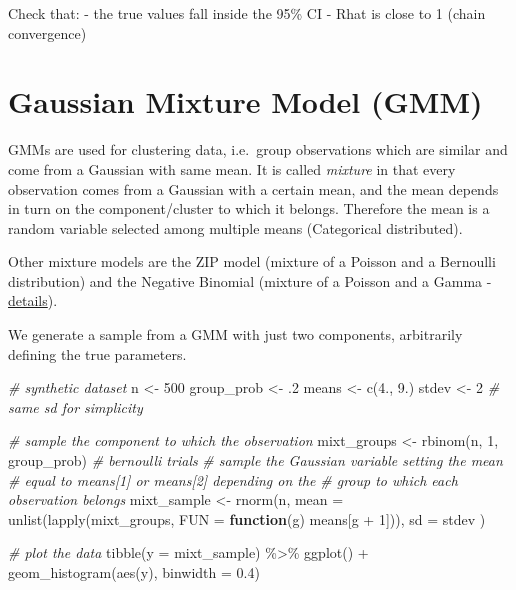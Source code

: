 \documentclass[
  oneside]{book}
\newenvironment{Shaded}{\begin{snugshade}}{\end{snugshade}}
\newcommand{\AttributeTok}[1]{\textcolor[rgb]{0.77,0.63,0.00}{#1}}
\newcommand{\CommentTok}[1]{\textcolor[rgb]{0.56,0.35,0.01}{\textit{#1}}}
\newcommand{\ControlFlowTok}[1]{\textcolor[rgb]{0.13,0.29,0.53}{\textbf{#1}}}
\newcommand{\DecValTok}[1]{\textcolor[rgb]{0.00,0.00,0.81}{#1}}
\newcommand{\FloatTok}[1]{\textcolor[rgb]{0.00,0.00,0.81}{#1}}
\newcommand{\FunctionTok}[1]{\textcolor[rgb]{0.00,0.00,0.00}{#1}}
\newcommand{\NormalTok}[1]{#1}
\newcommand{\OtherTok}[1]{\textcolor[rgb]{0.56,0.35,0.01}{#1}}
\newcommand{\SpecialCharTok}[1]{\textcolor[rgb]{0.00,0.00,0.00}{#1}}
\begin{document}
Check that:
- the true values fall inside the 95\% CI
- Rhat is close to 1 (chain convergence)

\hypertarget{gaussian-mixture-model-gmm}{%
\section{Gaussian Mixture Model (GMM)}\label{gaussian-mixture-model-gmm}}

GMMs are used for clustering data, i.e.~group
observations which are similar and come from a Gaussian
with same mean.
It is called \emph{mixture} in that every observation comes from
a Gaussian with a certain mean, and the mean depends in turn on
the component/cluster to which it belongs. Therefore the mean is
a random variable selected among multiple means (Categorical distributed).

Other mixture models are the ZIP model (mixture of a Poisson and a Bernoulli
distribution) and the Negative Binomial (mixture of a Poisson and a Gamma -
\href{https://en.wikipedia.org/wiki/Negative_binomial_distribution\#Gamma\%E2\%80\%93Poisson_mixture}{details}).

We generate a sample from a GMM with just two components, arbitrarily
defining the true parameters.

\begin{Shaded}
\begin{Highlighting}[]
\CommentTok{\# synthetic dataset}
\NormalTok{n }\OtherTok{\textless{}{-}} \DecValTok{500}
\NormalTok{group\_prob }\OtherTok{\textless{}{-}}\NormalTok{ .}\DecValTok{2}
\NormalTok{means }\OtherTok{\textless{}{-}} \FunctionTok{c}\NormalTok{(}\FloatTok{4.}\NormalTok{, }\FloatTok{9.}\NormalTok{)}
\NormalTok{stdev }\OtherTok{\textless{}{-}} \DecValTok{2} \CommentTok{\# same sd for simplicity}

\CommentTok{\# sample the component to which the observation}
\NormalTok{mixt\_groups }\OtherTok{\textless{}{-}} \FunctionTok{rbinom}\NormalTok{(n, }\DecValTok{1}\NormalTok{, group\_prob) }\CommentTok{\# bernoulli trials}
\CommentTok{\# sample the Gaussian variable setting the mean}
\CommentTok{\# equal to means[1] or means[2] depending on the}
\CommentTok{\# group to which each observation belongs}
\NormalTok{mixt\_sample }\OtherTok{\textless{}{-}} \FunctionTok{rnorm}\NormalTok{(n,}
  \AttributeTok{mean =} \FunctionTok{unlist}\NormalTok{(}\FunctionTok{lapply}\NormalTok{(mixt\_groups, }\AttributeTok{FUN =} \ControlFlowTok{function}\NormalTok{(g) means[g }\SpecialCharTok{+} \DecValTok{1}\NormalTok{])),}
  \AttributeTok{sd =}\NormalTok{ stdev}
\NormalTok{)}

\CommentTok{\# plot the data}
\FunctionTok{tibble}\NormalTok{(}\AttributeTok{y =}\NormalTok{ mixt\_sample) }\SpecialCharTok{\%\textgreater{}\%}
  \FunctionTok{ggplot}\NormalTok{() }\SpecialCharTok{+}
  \FunctionTok{geom\_histogram}\NormalTok{(}\FunctionTok{aes}\NormalTok{(y), }\AttributeTok{binwidth =} \FloatTok{0.4}\NormalTok{)}
\end{Highlighting}
\end{Shaded}
\end{document}
